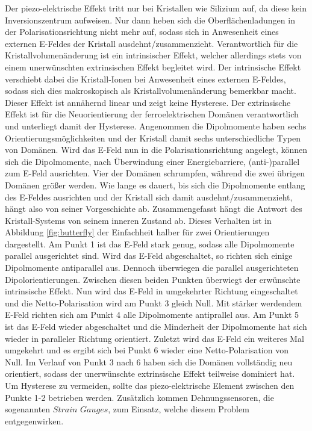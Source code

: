 \noindent
Der piezo-elektrische
Effekt tritt nur bei Kristallen wie Silizium auf, da diese kein Inversionszentrum
aufweisen. Nur dann heben sich die Oberflächenladungen in der Polarisationsrichtung
nicht mehr auf, sodass sich in Anwesenheit eines externen E-Feldes der Kristall
ausdehnt/zusammenzieht. Verantwortlich für die Kristallvolumenänderung ist ein
intrinsischer Effekt, welcher allerdings stets von einem unerwünschten extrinsischen
Effekt begleitet wird. Der intrinsische Effekt
verschiebt dabei die Kristall-Ionen bei Anwesenheit eines externen E-Feldes, sodass sich
dies makroskopisch als Kristallvolumenänderung bemerkbar macht. Dieser Effekt ist
annähernd linear und zeigt keine Hysterese. Der extrinsische Effekt ist für die
Neuorientierung der ferroelektrischen Domänen verantwortlich und unterliegt damit der Hysterese.
Angenommen die Dipolmomente haben sechs Orientierungsmöglichkeiten
und der Kristall damit sechs unterschiedliche Typen von Domänen. Wird das E-Feld nun in
die Polarisationsrichtung angelegt, können sich die Dipolmomente, nach Überwindung
einer Energiebarriere, (anti-)parallel zum E-Feld ausrichten. Vier der Domänen
schrumpfen, während die zwei übrigen Domänen größer werden. Wie lange es dauert,
bis sich die Dipolmomente entlang des E-Feldes ausrichten und der Kristall sich damit
ausdehnt/zusammenzieht, hängt also von seiner Vorgeschichte ab. Zusammengefasst
hängt die Antwort des Kristall-Systems von seinem inneren Zustand ab. Dieses
Verhalten ist in Abbildung \ref{fig:butterfly} der Einfachheit halber für zwei
Orientierungen dargestellt. Am Punkt 1 ist das E-Feld stark genug, sodass alle
Dipolmomente parallel ausgerichtet sind. Wird das E-Feld abgeschaltet, so
richten sich einige Dipolmomente antiparallel aus. Dennoch überwiegen die parallel
ausgerichteten Dipolorientierungen. Zwischen diesen beiden Punkten überwiegt der
erwünschte intrinsische Effekt.
Nun wird das E-Feld in umgekehrter Richtung eingeschaltet und die Netto-Polarisation
wird am Punkt 3 gleich Null. Mit stärker werdendem E-Feld richten sich am Punkt 4 alle
Dipolmomente antiprallel aus. Am Punkt 5 ist das E-Feld wieder abgeschaltet und
die Minderheit der Dipolmomente hat sich wieder in paralleler Richtung orientiert.
Zuletzt wird das E-Feld ein weiteres Mal umgekehrt und es ergibt sich bei Punkt 6
wieder eine Netto-Polarisation
von Null. Im Verlauf von Punkt 3 nach 6 haben sich die Domänen vollständig neu orientiert,
sodass der unerwünschte extrinsische Effekt teilweise dominiert hat. Um Hysterese
zu vermeiden, sollte das piezo-elektrische Element zwischen den Punkte 1-2 betrieben
werden. Zusätzlich kommen Dehnungssensoren, die sogenannten $\textit{Strain Gauges}$,
zum Einsatz, welche diesem Problem entgegenwirken.


